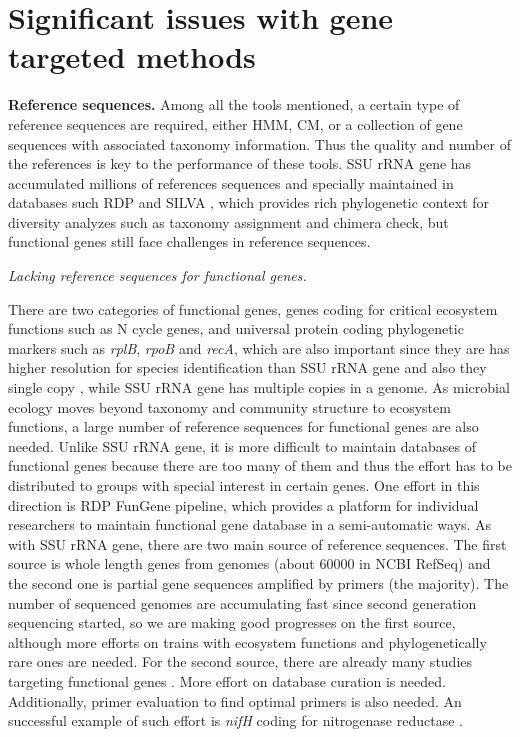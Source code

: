 \documentclass[]{msu-thesis}
\begin{document}
\section{Significant issues with gene targeted methods}

\textbf{Reference sequences. } Among all the tools mentioned, a
certain type of reference sequences are required, either HMM, CM, or a
collection of gene sequences with associated taxonomy
information. Thus the quality and number of the references is key to
the performance of these tools. SSU rRNA gene has accumulated millions
of references sequences and specially maintained in databases such RDP
and SILVA \cite{cole_ribosomal_2014,quast_silva_2013}, which provides
rich phylogenetic context for diversity analyzes such as taxonomy
assignment and chimera check, but functional genes still face
challenges in reference sequences.

\textit{Lacking reference sequences for functional genes. }

There are two categories of functional genes, genes coding for
critical ecosystem functions such as N cycle genes, and universal
protein coding phylogenetic markers such as \textit{rplB},
\textit{rpoB} and \textit{recA}, which are also important since they
are has higher resolution for species identification than SSU rRNA
gene and also they single copy
\cite{case_use_2007,roux_comparison_2011}, while SSU rRNA gene has
multiple copies in a genome. As microbial ecology moves beyond
taxonomy and community structure to ecosystem functions, a large
number of reference sequences for functional genes are also
needed. Unlike SSU rRNA gene, it is more difficult to maintain
databases of functional genes because there are too many of them and
thus the effort has to be distributed to groups with special interest
in certain genes. One effort in this direction is RDP FunGene
pipeline, which provides a platform for individual researchers to
maintain functional gene database in a semi-automatic ways. As with
SSU rRNA gene, there are two main source of reference sequences. The
first source is whole length genes from genomes (about 60000 in NCBI
RefSeq) and the second one is partial gene sequences amplified by
primers (the majority). The number of sequenced genomes are
accumulating fast since second generation sequencing started, so we
are making good progresses on the first source, although more efforts
on trains with ecosystem functions and phylogenetically rare ones are
needed. For the second source, there are already many studies
targeting functional genes
\cite{penton_functional_2013,hai_quantification_2009,treusch_novel_2005,huang_biodiversity_2011}. More
effort on database curation is needed. Additionally, primer evaluation
to find optimal primers is also needed. An successful example of such
effort is \textit{nifH} coding for nitrogenase reductase
\cite{gaby_comprehensive_2014,gaby_comprehensive_2012}.
\end{document}
